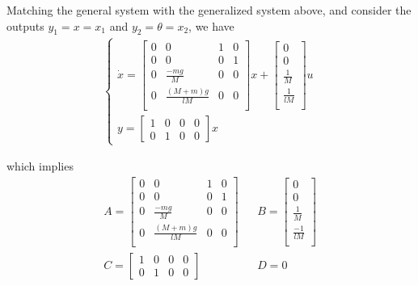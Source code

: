 \documentclass [12pt,letterpaper]{exam}
\begin{document}
Matching the general system with the generalized system above, and consider the outputs $y_1 = x = x_1$ and $y_2 = \theta = x_2 $, we have
\begin{align}
\begin{cases}
\dot{x} = \begin{bmatrix}
0 & 0 & 1 & 0 \\
0 & 0 & 0 & 1 \\
0 & \frac{-mg}{M} & 0 & 0 \\
0 & \frac{(M + m)g}{lM} & 0 & 0 \\
\end{bmatrix} x
+
\begin{bmatrix}
0 \\
0 \\
\frac{1}{M} \\
\frac{1}{lM} \\
\end{bmatrix} u \\
y = \begin{bmatrix}
1 & 0 & 0 & 0 \\
0 & 1 & 0 & 0
\end{bmatrix} x
\end{cases}
\end{align}

which implies
\begin{align}
A = \begin{bmatrix}
0 & 0 & 1 & 0 \\
0 & 0 & 0 & 1 \\
0 & \frac{-mg}{M} & 0 & 0 \\
0 & \frac{(M + m)g}{lM} & 0 & 0 \\
\end{bmatrix} & &
B = \begin{bmatrix}
0 \\
0 \\
\frac{1}{M} \\
\frac{-1}{lM} \\
\end{bmatrix} \\
C = \begin{bmatrix}
1 & 0 & 0 & 0 \\
0 & 1 & 0 & 0
\end{bmatrix} & &
D = 0
\end{align}
\end{document}
